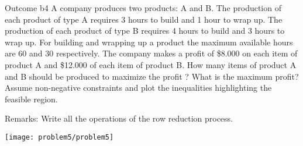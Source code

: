 \begin{problem}{Outcome b}{4}
A company produces two products: A and B. 
The production of each product of type A requires 3 hours to build and 1 hour to wrap up.
The production of each product of type B requires 4 hours to build and 3 hours to wrap up. 
For building and wrapping up a product the maximum available hours are 60 and 30 respectively. 
The company makes a profit of \$8.000 on each item of product A and \$12.000 of each item of product B. 
How many items of product A and B should be produced to maximize the profit ? What is the maximum profit? Assume non-negative constraints and plot the inequalities highlighting the feasible region.\newline

Remarks: Write all the operations of the row reduction process.

\begin{center}
    \texttt{[image: problem5/problem5]}
\end{center}

\end{problem}





